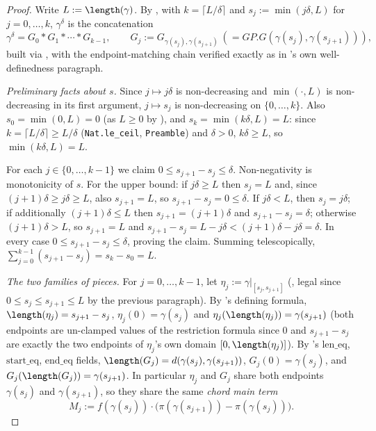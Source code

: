 \begin{proof}
  Write $L := \length(\gamma)$. By , with $k = \lceil L/\delta \rceil$ and
  $s_j := \min(j\delta, L)$ for $j = 0,\dots,k$, $\gamma^\delta$ is the concatenation
  \[
    \gamma^\delta = G_0 * G_1 * \cdots * G_{k-1}
    , \qquad G_j := G_{\gamma(s_j),\gamma(s_{j+1})} \ (= GP.G(\gamma(s_j),\gamma(s_{j+1})))
    ,
  \]
  built via , with the endpoint-matching chain verified exactly as in
  's own well-definedness paragraph.

  \emph{Preliminary facts about $s$.} Since $j \mapsto j\delta$ is non-decreasing and $\min(\cdot,L)$
  is non-decreasing in its first argument, $j \mapsto s_j$ is non-decreasing on $\{0,\dots,k\}$.
  Also $s_0 = \min(0,L) = 0$ (as $L \ge 0$ by ), and $s_k = \min(k\delta,L) = L$: since
  $k = \lceil L/\delta\rceil \ge L/\delta$ (\texttt{Nat.le\_ceil}, \texttt{Preamble}) and $\delta>0$,
  $k\delta \ge L$, so $\min(k\delta,L)=L$.

  For each $j \in \{0,\dots,k-1\}$ we claim $0 \le s_{j+1}-s_j \le \delta$. Non-negativity is
  monotonicity of $s$. For the upper bound: if $j\delta \ge L$ then $s_j = L$ and, since
  $(j+1)\delta \ge j\delta \ge L$, also $s_{j+1}=L$, so $s_{j+1}-s_j=0\le\delta$. If $j\delta < L$,
  then $s_j = j\delta$; if additionally $(j+1)\delta \le L$ then $s_{j+1}=(j+1)\delta$ and
  $s_{j+1}-s_j=\delta$; otherwise $(j+1)\delta > L$, so $s_{j+1}=L$ and
  $s_{j+1}-s_j = L - j\delta < (j+1)\delta - j\delta = \delta$. In every case
  $0 \le s_{j+1}-s_j\le\delta$, proving the claim. Summing telescopically,
  $\sum_{j=0}^{k-1}(s_{j+1}-s_j) = s_k - s_0 = L$.

  \emph{The two families of pieces.} For $j=0,\dots,k-1$, let
  $\eta_j := \gamma|_{[s_j,s_{j+1}]}$ (, legal since $0\le s_j\le s_{j+1}\le L$
  by the previous paragraph). By 's defining formula, $\length(\eta_j) =
  s_{j+1}-s_j$, $\eta_j(0) = \gamma(s_j)$ and $\eta_j(\length(\eta_j)) = \gamma(s_{j+1})$ (both
  endpoints are un-clamped values of the restriction formula since $0$ and $s_{j+1}-s_j$ are exactly
  the two endpoints of $\eta_j$'s own domain $[0,\length(\eta_j)]$). By 's
  $\mathrm{len\_eq}$, $\mathrm{start\_eq}$, $\mathrm{end\_eq}$ fields, $\length(G_j) =
  d(\gamma(s_j),\gamma(s_{j+1}))$, $G_j(0)=\gamma(s_j)$, and $G_j(\length(G_j)) = \gamma(s_{j+1})$.
  In particular $\eta_j$ and $G_j$ share both endpoints $\gamma(s_j)$ and $\gamma(s_{j+1})$, so they
  share the same \emph{chord main term}
  \[
    M_j := f(\gamma(s_j)) \cdot \bigl(\pi(\gamma(s_{j+1})) - \pi(\gamma(s_j))\bigr)
    .
  \]


\end{proof}
